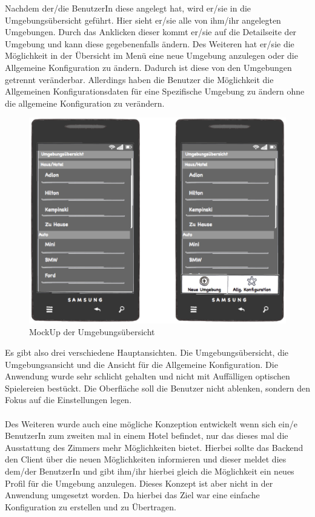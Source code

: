 Nachdem der/die BenutzerIn diese angelegt hat, wird er/sie in die Umgebungsübersicht geführt. Hier sieht er/sie alle von ihm/ihr angelegten Umgebungen. Durch das Anklicken dieser kommt er/sie auf die Detailseite der Umgebung und kann diese gegebenenfalls ändern.       
Des Weiteren hat er/sie die Möglichkeit in der Übersicht im Menü eine neue Umgebung anzulegen oder die Allgemeine Konfiguration zu ändern. Dadurch ist diese von den Umgebungen getrennt veränderbar. Allerdings haben die Benutzer die Möglichkeit die Allgemeinen Konfigurationsdaten für eine Spezifische Umgebung zu ändern ohne die allgemeine Konfiguration zu verändern. 

\begin{figure}[H]
\includegraphics[width=12.5cm]{MockUps/Umgebung}
\caption{MockUp der Umgebungsübersicht}
\end{figure}

Es gibt also drei verschiedene Hauptansichten. Die Umgebungsübersicht, die Umgebungsansicht und die Ansicht für die Allgemeine Konfiguration. Die Anwendung wurde sehr schlicht gehalten und nicht mit Auffälligen optischen Spielereien bestückt. Die Oberfläche soll die Benutzer nicht ablenken, sondern den Fokus auf die Einstellungen legen. 
\\\\
Des Weiteren wurde auch eine mögliche Konzeption entwickelt wenn sich ein/e BenutzerIn zum zweiten mal in einem Hotel befindet, nur das dieses mal die Ausstattung des Zimmers mehr Möglichkeiten bietet. Hierbei sollte das Backend den Client über die neuen Möglichkeiten informieren und dieser meldet dies dem/der BenutzerIn und gibt ihm/ihr hierbei gleich die Möglichkeit ein neues Profil für die Umgebung anzulegen. Dieses Konzept ist aber nicht in der Anwendung umgesetzt worden. Da hierbei das Ziel war eine einfache Konfiguration zu erstellen und zu Übertragen.

